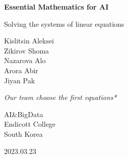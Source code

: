 \documentclass[14pt, letterpaper, fleqn]{extarticle}
\begin{document}
\begin{titlepage}
   \begin{center}
       \vspace*{2.5cm}

       \textbf{Essential Mathematics for AI}

       \vspace{0.5cm}
        Solving the systems of linear equations
            
       \vspace{2cm}

       Kislitsin Aleksei \\
       Zikirov Shoma \\
       Nazarova Alo \\
       Arora Abir \\
 	  Jiyan Pak

	\vspace{4cm}

	\large{\textit{Our team choose the first equations*}}
	
	\vfill
       \vspace{1cm}
            
       AI\&BigData\\
       Endicott College\\
       South Korea\\

       \vspace{0.5cm}

       2023.03.23
            
   \end{center}
\end{titlepage}
\end{document}
